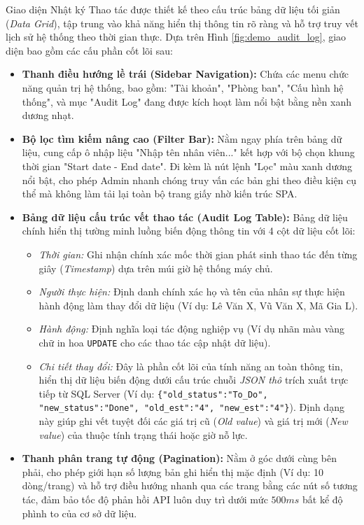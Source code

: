 \documentclass[a4paper,13.5pt]{extreport}
\begin{document}
Giao diện Nhật ký Thao tác được thiết kế theo cấu trúc bảng dữ liệu tối giản (\textit{Data Grid}), tập trung vào khả năng hiển thị thông tin rõ ràng và hỗ trợ truy vết lịch sử hệ thống theo thời gian thực. Dựa trên Hình \ref{fig:demo_audit_log}, giao diện bao gồm các cấu phần cốt lõi sau:
\begin{itemize}
    \item \textbf{Thanh điều hướng lề trái (Sidebar Navigation):} Chứa các menu chức năng quản trị hệ thống, bao gồm: "Tài khoản", "Phòng ban", "Cấu hình hệ thống", và mục "Audit Log" đang được kích hoạt làm nổi bật bằng nền xanh dương nhạt.
    \item \textbf{Bộ lọc tìm kiếm nâng cao (Filter Bar):} Nằm ngay phía trên bảng dữ liệu, cung cấp ô nhập liệu "Nhập tên nhân viên..." kết hợp với bộ chọn khung thời gian "Start date - End date". Đi kèm là nút lệnh "Lọc" màu xanh dương nổi bật, cho phép Admin nhanh chóng truy vấn các bản ghi theo điều kiện cụ thể mà không làm tải lại toàn bộ trang giấy nhờ kiến trúc SPA.
    \item \textbf{Bảng dữ liệu cấu trúc vết thao tác (Audit Log Table):} Bảng dữ liệu chính hiển thị tường minh luồng biến động thông tin với 4 cột dữ liệu cốt lõi:
    \begin{itemize}
        \item \textit{Thời gian:} Ghi nhận chính xác mốc thời gian phát sinh thao tác đến từng giây (\textit{Timestamp}) dựa trên múi giờ hệ thống máy chủ.
        \item \textit{Người thực hiện:} Định danh chính xác họ và tên của nhân sự thực hiện hành động làm thay đổi dữ liệu (Ví dụ: Lê Văn X, Vũ Văn X, Mã Gia L).
        \item \textit{Hành động:} Định nghĩa loại tác động nghiệp vụ (Ví dụ nhãn màu vàng chữ in hoa \texttt{UPDATE} cho các thao tác cập nhật dữ liệu).
        \item \textit{Chi tiết thay đổi:} Đây là phần cốt lõi của tính năng an toàn thông tin, hiển thị dữ liệu biến động dưới cấu trúc chuỗi \textit{JSON thô} trích xuất trực tiếp từ SQL Server (Ví dụ: \texttt{\{"old\_status":"To\_Do", "new\_status":"Done", "old\_est":"4", "new\_est":"4"\}}). Định dạng này giúp ghi vết tuyệt đối các giá trị cũ (\textit{Old value}) và giá trị mới (\textit{New value}) của thuộc tính trạng thái hoặc giờ nỗ lực.
    \end{itemize}
    \item \textbf{Thanh phân trang tự động (Pagination):} Nằm ở góc dưới cùng bên phải, cho phép giới hạn số lượng bản ghi hiển thị mặc định (Ví dụ: 10 dòng/trang) và hỗ trợ điều hướng nhanh qua các trang bằng các nút số tương tác, đảm bảo tốc độ phản hồi API luôn duy trì dưới mức $500ms$ bất kể độ phình to của cơ sở dữ liệu.
\end{itemize}
\end{document}
